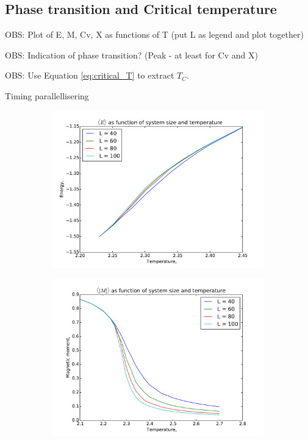 \subsection{Phase transition and Critical temperature}



OBS: Plot of E, M, Cv, X as functions of T (put L as legend and plot together)

OBS: Indication of phase transition? (Peak - at least for Cv and X)

OBS: Use Equation \ref{eq:critical_T} to extract $T_C$.


Timing parallellisering

	\begin{figure}[H]
	\begin{subfigure}[b]{0.5\textwidth}
	\includegraphics[width=1\linewidth]{../results/4e/4e_energy}
\caption{}
\label{fig:4eenergy}
	\end{subfigure}
	\hfill
	\begin{subfigure}[b]{0.5\textwidth}
	\includegraphics[width=1\linewidth]{../results/4e/4e_mag}
\caption{}
\label{fig:4emag}
	\end{subfigure}
	\caption{}
\end{figure}




